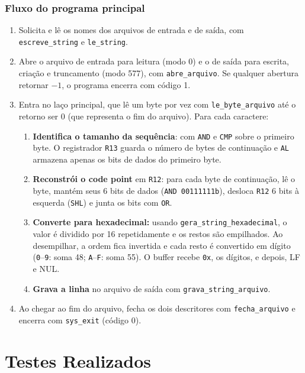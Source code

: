 \documentclass[12pt,a4paper]{article}
\begin{document}
\subsubsection*{Fluxo do programa principal}
\begin{enumerate}
    \item Solicita e lê os nomes dos arquivos de entrada e de saída, com \texttt{escreve\_string} e \texttt{le\_string}.
    \item Abre o arquivo de entrada para leitura (modo 0) e o de saída para escrita, criação e truncamento (modo 577), com \texttt{abre\_arquivo}. Se qualquer abertura retornar $-1$, o programa encerra com código 1.
    
    \item Entra no laço principal, que lê um byte por vez com \texttt{le\_byte\_arquivo} até o retorno ser 0 (que representa o fim do arquivo). Para cada caractere:
    \begin{enumerate}
        \item \textbf{Identifica o tamanho da sequência}: com \texttt{AND} e \texttt{CMP} sobre o primeiro byte. O registrador \texttt{R13} guarda o número de bytes de continuação e \texttt{AL} armazena apenas os bits de dados do primeiro byte. 
        \item \textbf{Reconstrói o code point} em \texttt{R12}: para cada byte de continuação, lê o byte, mantém seus 6 bits de dados (\texttt{AND 00111111b}), desloca \texttt{R12} 6 bits à esquerda (\texttt{SHL}) e junta os bits com \texttt{OR}.
        \item \textbf{Converte para hexadecimal:} usando \texttt{gera\_string\_hexadecimal}, o valor é dividido por 16 repetidamente e os restos são empilhados. Ao desempilhar, a ordem fica invertida e cada resto é convertido em dígito (\texttt{0}--\texttt{9}: soma 48; \texttt{A}--\texttt{F}: soma 55). O buffer recebe \texttt{0x}, os dígitos, e depois, LF e NUL.
        \item \textbf{Grava a linha} no arquivo de saída com \texttt{grava\_string\_arquivo}.
    \end{enumerate}
    \item Ao chegar ao fim do arquivo, fecha os dois descritores com \texttt{fecha\_arquivo} e encerra com \texttt{sys\_exit} (código 0).
\end{enumerate}

\section{Testes Realizados}
\end{document}
